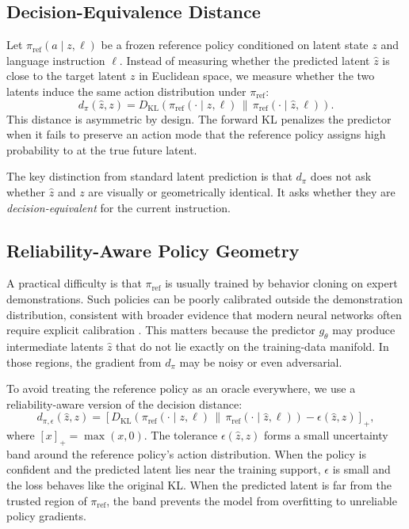 \documentclass[10pt,twocolumn]{article}
\theoremstyle{tightstyle}
\begin{document}
\subsection{Decision-Equivalence Distance}

Let $\pi_{\mathrm{ref}}(a \mid z,\ell)$ be a frozen reference policy conditioned on
latent state $z$ and language instruction $\ell$.
Instead of measuring whether the predicted latent $\hat z$ is close to the target
latent $z$ in Euclidean space, we measure whether the two latents induce the same
action distribution under $\pi_{\mathrm{ref}}$:
\begin{equation}
  d_\pi(\hat z,z)
  =
  D_{\mathrm{KL}}\!\left(
  \pi_{\mathrm{ref}}(\cdot \mid z,\ell)
  \,\middle\|\,
  \pi_{\mathrm{ref}}(\cdot \mid \hat z,\ell)
  \right).
  \label{eq:dpi}
\end{equation}
This distance is asymmetric by design. The forward KL penalizes the predictor when
it fails to preserve an action mode that the reference policy assigns high
probability to at the true future latent.

The key distinction from standard latent prediction is that $d_\pi$ does not ask
whether $\hat z$ and $z$ are visually or geometrically identical. It asks whether
they are \emph{decision-equivalent} for the current instruction.

\subsection{Reliability-Aware Policy Geometry}
\label{sec:reliable-geometry}

A practical difficulty is that $\pi_{\mathrm{ref}}$ is usually trained by behavior
cloning on expert demonstrations.
Such policies can be poorly calibrated outside the demonstration distribution, consistent with broader evidence that modern neural networks often require explicit calibration \citep{guo2017calibration}.
This matters because the predictor $g_\theta$ may produce intermediate latents
$\hat z$ that do not lie exactly on the training-data manifold.
In those regions, the gradient from $d_\pi$ may be noisy or even adversarial.

To avoid treating the reference policy as an oracle everywhere, we use a
reliability-aware version of the decision distance:
\begin{equation}
  d_{\pi,\epsilon}(\hat z,z)
  =
  \left[
  D_{\mathrm{KL}}\!\left(
  \pi_{\mathrm{ref}}(\cdot \mid z,\ell)
  \,\middle\|\,
  \pi_{\mathrm{ref}}(\cdot \mid \hat z,\ell)
  \right)
  -
  \epsilon(\hat z,z)
  \right]_+ ,
  \label{eq:banded-dpi}
\end{equation}
where $[x]_+ = \max(x,0)$.
The tolerance $\epsilon(\hat z,z)$ forms a small uncertainty band around the
reference policy's action distribution.
When the policy is confident and the predicted latent lies near the training
support, $\epsilon$ is small and the loss behaves like the original KL.
When the predicted latent is far from the trusted region of $\pi_{\mathrm{ref}}$,
the band prevents the model from overfitting to unreliable policy gradients.
\end{document}
